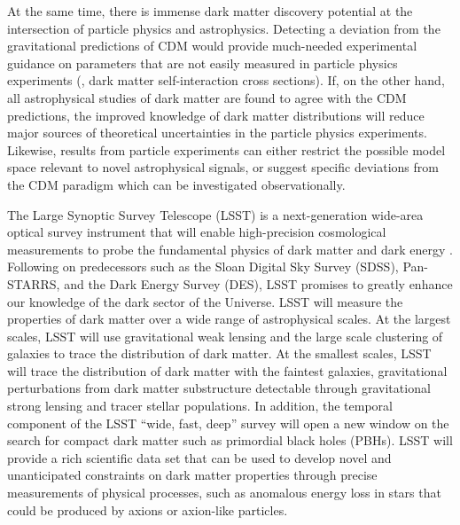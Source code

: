 
At the same time, there is immense dark matter discovery potential at the intersection of particle physics and astrophysics.
Detecting a deviation from the gravitational predictions of CDM would provide much-needed experimental guidance on parameters that are not easily measured in particle physics experiments (\eg, dark matter self-interaction cross sections). 
If, on the other hand, all astrophysical studies of dark matter are found to agree with the CDM predictions, the improved knowledge of dark matter distributions will reduce major sources of theoretical uncertainties in the particle physics experiments. 
Likewise, results from particle experiments can either restrict the possible model space relevant to novel astrophysical signals, or suggest specific deviations from the CDM paradigm which can be investigated observationally.

The Large Synoptic Survey Telescope (LSST) is a next-generation wide-area optical survey instrument that will enable high-precision cosmological measurements to probe the fundamental physics of dark matter and dark energy \citep{0805.2366}. Following on predecessors such as the Sloan Digital Sky Survey (SDSS), Pan-STARRS, and the Dark Energy Survey (DES), LSST promises to greatly enhance our knowledge of the dark sector of the Universe. 
LSST will measure the properties of dark matter over a wide range of astrophysical scales. 
At the largest scales, LSST will use gravitational weak lensing and the large scale clustering of galaxies to trace the distribution of dark matter.
At the smallest scales, LSST will trace the distribution of dark matter with the faintest galaxies, gravitational perturbations from dark matter substructure detectable through gravitational strong lensing and tracer stellar populations.
In addition, the temporal component of the LSST ``wide, fast, deep'' survey will open a new window on the search for compact dark matter such as primordial black holes (PBHs).
LSST will provide a rich scientific data set that can be used to develop novel and unanticipated constraints on dark matter properties through precise measurements of physical processes, such as anomalous energy loss in stars that could be produced by axions or axion-like particles.

